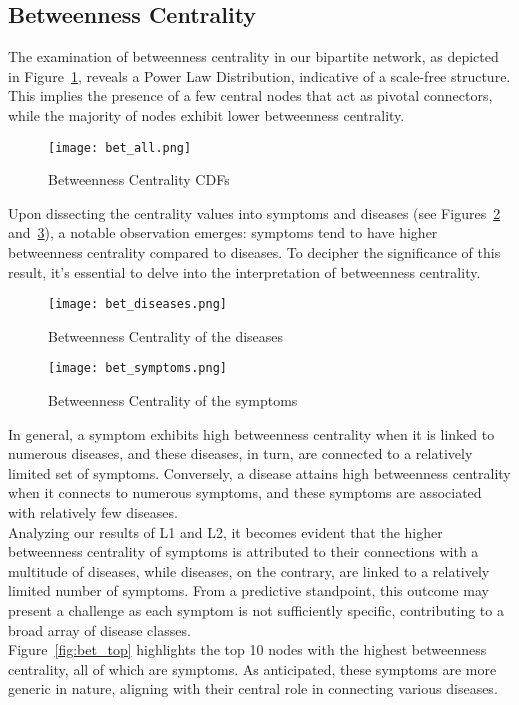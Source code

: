 \subsection{Betweenness Centrality}
The examination of betweenness centrality in our bipartite network, as depicted in Figure~\ref{fig:bet_all},
reveals a Power Law Distribution, indicative of a scale-free structure. This implies the presence of a few central
nodes that act as pivotal connectors, while the majority of nodes exhibit lower betweenness centrality.

\begin{figure}[H]
    \centering
    \texttt{[image: bet\_all.png]}
    \caption{Betweenness Centrality CDFs}\label{fig:bet_all}
\end{figure}
\noindent
Upon dissecting the centrality values into symptoms and diseases (see Figures~\ref{fig:bet_diseases} and~\ref{fig:bet_symptoms}),
a notable observation emerges: symptoms tend to have higher betweenness centrality compared to diseases. To decipher the
significance of this result, it's essential to delve into the interpretation of betweenness centrality.

\begin{figure}[H]
    \centering
    \texttt{[image: bet\_diseases.png]}
    \caption{Betweenness Centrality of the diseases}\label{fig:bet_diseases}
\end{figure}
\noindent
\begin{figure}[H]
    \centering
    \texttt{[image: bet\_symptoms.png]}
    \caption{Betweenness Centrality of the symptoms}\label{fig:bet_symptoms}
\end{figure}
\noindent
In general, a symptom exhibits high betweenness centrality when it is linked to numerous diseases, and these diseases,
in turn, are connected to a relatively limited set of symptoms. Conversely, a disease attains high betweenness centrality
when it connects to numerous symptoms, and these symptoms are associated with relatively few diseases.\\
Analyzing our results of L1 and L2, it becomes evident that the higher betweenness centrality of symptoms is attributed
to their connections with a multitude of diseases, while diseases, on the contrary, are linked to a relatively limited
number of symptoms. From a predictive standpoint, this outcome may present a challenge as each symptom is not sufficiently
specific, contributing to a broad array of disease classes.\\
Figure~\ref{fig:bet_top} highlights the top 10 nodes with the highest betweenness centrality, all of which are symptoms.
As anticipated, these symptoms are more generic in nature, aligning with their central role in connecting various diseases.


